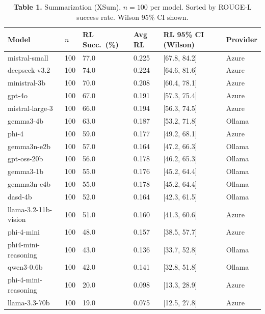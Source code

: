 \documentclass[11pt,letterpaper]{article}
\begin{document}
\vspace{0.2cm}

\begin{table}[h!]
\centering
\caption*{\textbf{Table 1.} Summarization (XSum), $n=100$ per model. Sorted by ROUGE-L success rate. Wilson 95\% CI shown.}
\begin{tabular}{l C{1.0cm} R{1.4cm} R{1.2cm} R{2.8cm} l}
\toprule
\textbf{Model} & \textbf{$n$} & \textbf{RL Succ.\ (\%)} & \textbf{Avg RL} & \textbf{RL 95\% CI (Wilson)} & \textbf{Provider} \\
\midrule
{} mistral-small        & 100 & 77.0 & 0.225 & [67.8, 84.2] & Azure \\
 deepseek-v3.2        & 100 & 74.0 & 0.224 & [64.6, 81.6] & Azure \\
 ministral-3b         & 100 & 70.0 & 0.208 & [60.4, 78.1] & Azure \\
 gpt-4o               & 100 & 67.0 & 0.191 & [57.3, 75.4] & Azure \\
 mistral-large-3      & 100 & 66.0 & 0.194 & [56.3, 74.5] & Azure \\
gemma3-4b            & 100 & 63.0 & 0.187 & [53.2, 71.8] & Ollama \\
phi-4                & 100 & 59.0 & 0.177 & [49.2, 68.1] & Azure \\
gemma3n-e2b          & 100 & 57.0 & 0.164 & [47.2, 66.3] & Ollama \\
gpt-oss-20b          & 100 & 56.0 & 0.178 & [46.2, 65.3] & Ollama \\
gemma3-1b            & 100 & 55.0 & 0.176 & [45.2, 64.4] & Ollama \\
gemma3n-e4b          & 100 & 55.0 & 0.178 & [45.2, 64.4] & Ollama \\
dasd-4b              & 100 & 52.0 & 0.164 & [42.3, 61.5] & Ollama \\
llama-3.2-11b-vision & 100 & 51.0 & 0.160 & [41.3, 60.6] & Azure \\
phi-4-mini           & 100 & 48.0 & 0.157 & [38.5, 57.7] & Azure \\
phi4-mini-reasoning  & 100 & 43.0 & 0.136 & [33.7, 52.8] & Ollama \\
qwen3-0.6b           & 100 & 42.0 & 0.141 & [32.8, 51.8] & Ollama \\
 phi-4-mini-reasoning & 100 & 20.0 & 0.098 & [13.3, 28.9] & Azure \\
 llama-3.3-70b        & 100 & 19.0 & 0.075 & [12.5, 27.8] & Azure \\

\end{tabular}
\end{table}
\end{document}
